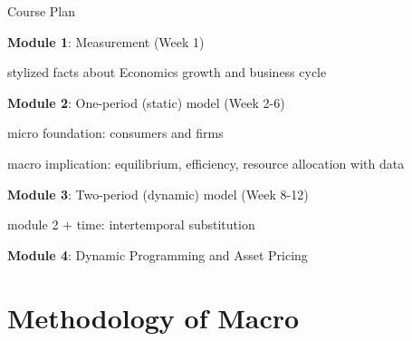 \documentclass[11pt,aspectratio=169,usenames,dvipsnames]{beamer}
\let\tempone\itemize
\let\temptwo\enditemize
\renewenvironment{itemize}{\tempone\addtolength{\itemsep}{\fill}}{\temptwo}
\begin{document}
\begin{frame}{Course Plan}
\label{slide:Course_Plan}
\begin{itemize}
    \item \textbf{Module 1}: Measurement (Week 1)
    \begin{itemize}
        \item stylized facts about Economics growth and business cycle
    \end{itemize}
    \item \textbf{Module 2}: One-period (\alert{static}) model (Week 2-6)
    \begin{itemize}
        \item micro foundation: consumers and firms
        \item macro implication: equilibrium, efficiency, resource allocation with data
    \end{itemize}
    \item \textbf{Module 3}: Two-period (\alert{dynamic}) model (Week 8-12)
    \begin{itemize}
        \item module 2 $ + $ time: \alert{intertemporal substitution}
    \end{itemize}
    \item \textbf{Module 4}: Dynamic Programming and Asset Pricing
\end{itemize}
\end{frame}

\section{Methodology of Macro}
\label{sec:Methodology_of_Macro}
\end{document}

